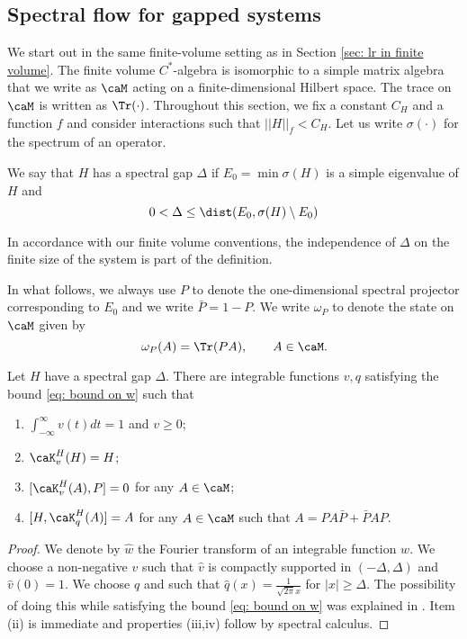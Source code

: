 \subsection{Spectral flow for gapped systems}\label{sec: spectral flow}
We start out in the same finite-volume setting as in Section \ref{sec: lr in finite volume}. The finite volume $C^*$-algebra is isomorphic to a simple matrix algebra that we write as $\caM$ acting on a finite-dimensional Hilbert space. The trace on $\caM$ is  written as $\Tr(\cdot)$.
Throughout this section, we fix a constant $C_H$ and a function $f$ and consider interactions such that $||H||_f<C_H$.
Let us write $\sigma(\cdot)$ for the spectrum of an operator. 
\begin{definition} We say that $H$ has a spectral gap $\Delta$ if $E_0=\min\sigma(H)$ is a simple eigenvalue of $H$ and 
	$$ 0<\Delta \leq \dist(E_0,\sigma(H)\setminus E_0) $$
\end{definition}
\noindent In accordance with our finite volume conventions, the independence of $\Delta$ on the finite size of the system is part of the definition.

In what follows, we always use $P$ to denote the one-dimensional spectral projector corresponding to $E_0$ and we write $\bar P=1-P$. 
We write $\omega_P$ to denote the state on $\caM$ given by 
$$ \omega_P(A) = \Tr (P A), \qquad A \in  \caM.
$$
%
\begin{lemma}\label{lem: Block diagonalization} 
	Let $H$ have a spectral gap $\Delta$.  There are integrable functions $v,q$ satisfying the bound \eqref{eq: bound on w} such that 
	\begin{enumerate}
		\item $\int_{-\infty}^{\infty} v(t) dt=1$ and $v\geq 0$;
		\item  $\caK^H_v(H)=H$;
		\item $[\caK^H_v(A),P]=0$ for any $A\in \caM$;
		\item $[H,\caK^H_q(A)]=A$ for any $A\in \caM$ such that $A=P A\bar{P}+ \bar{P} A{P}$.  
	\end{enumerate}
\end{lemma}
\begin{proof}
	We denote by $\widehat{w}$ the Fourier transform of an integrable function $w$. We choose a non-negative $v$ such that $\hat v$ is compactly supported in $(-\Delta,\Delta)$ and $\hat{v}(0)=1$. We choose $q$ and such that   
	$\hat q(x)=\frac{1}{\sqrt{2\pi}x}$ for $|x| \geq \Delta$. 
	The possibility of doing this while satisfying the bound \eqref{eq: bound on w} was explained in \cite{bachmann2012automorphic}. Item (ii) is immediate and properties (iii,iv) follow by spectral calculus.
\end{proof}

